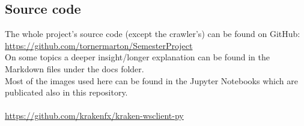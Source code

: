 \documentclass[11pt,a4paper,oneside]{article}
\begin{document}
\subsection{Source code}
\label{sec:source_code}

The whole project's source code (except the crawler's) can be found on GitHub: \\ 
\url{https://github.com/tornermarton/SemesterProject} \\
On some topics a deeper insight/longer explanation can be found in the Markdown files under the docs folder. \\
Most of the images used here can be found in the Jupyter Notebooks which are publicated also in this repository. \\

\vspace{5mm}
 \\
\url{https://github.com/krakenfx/kraken-wsclient-py} 
\end{document}
